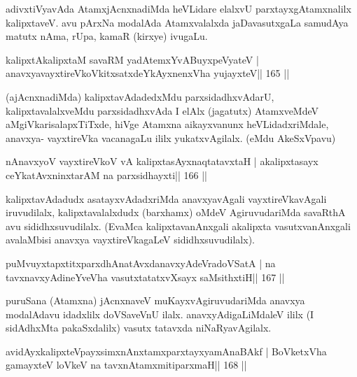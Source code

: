 \begin{artha}
adivxtiVyavAda AtamxjAcnxnadiMda heVLidare elalxvU parxtayxgAtamxnalilx  kalipxtaveV. avu pArxNa modalAda Atamxvalalxda jaDavasutxgaLa samudAya matutx nAma, rUpa, kamaR (kirxye) ivugaLu.
\end{artha}

\begin{shl}
kalipxtAkalipxtaM savaRM yadA\s\s temxYvABuyxpeVyateV |
anavxyavayxtireVkoVkitxsatxdeYkAyxnenxVha yujayxteV\hfill || 165 ||
\end{shl}

\begin{artha}
(ajAcnxnadiMda) kalipxtavAdadedxMdu parxsidadhxvAdarU, 
kalipxtavalalxveMdu parxsidadhxvAda I elAlx (jagatutx) AtamxveMdeV aMgiVkarisalapxTiTxde, hiVge Atamxna aikayxvanunx heVLidadxriMdale, anavxya- vayxtireVka vacanagaLu ililx yukatxvAgilalx. (eMdu AkeSxVpavu)
\end{artha}


\begin{shl}
nAnavxyoV vayxtireVkoV vA kalipxtasAyxnaqtatavxtaH |
akalipxtasayx ceYkatAvxninxtarAM na parxsidhayxti\hfill || 166 ||
\end{shl}

\begin{artha}
kalipxtavAdadudx asatayxvAdadxriMda anavxyavAgali vayxtireVkavAgali 
iruvudilalx, kalipxtavalalxdudx (barxhamx) oMdeV AgiruvudariMda savaRthA avu sididhxsuvudilalx. (EvaMca kalipxtavanAnxgali akalipxta vasutxvanAnxgali avalaMbisi anavxya vayxtireVkagaLeV sididhxsuvudilalx).
\end{artha}


\begin{shl}
puMvuyxtapxtitxparxdhAnatAvxdanavxyAdeVradoVSatA |
na tavxnavxyAdineYveVha vasutxtatatxvXsayx saMsithxtiH\hfill || 167 ||
\end{shl}

\begin{artha}
puruSana (Atamxna) jAcnxnaveV muKayxvAgiruvudariMda anavxya modalAdavu  idadxlilx doVSaveVnU ilalx. anavxyAdigaLiMdaleV ililx (I sidAdhxMta pakaSxdalilx) vasutx tatavxda niNaRyavAgilalx.
\end{artha}

\begin{shl}
avidAyxkalipxteV\s payxsimxnAnxtamxparxtayxyamAnaBAkf |
BoVketxVha gamayxteV loVkeV na tavxnAtamxmitiparxmaH\hfill || 168 ||
\end{shl}

